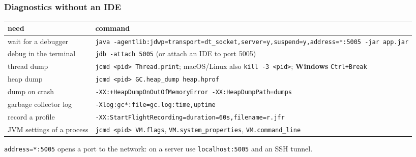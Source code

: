 \documentclass[aspectratio=169,10pt,compress]{beamer}
\newcommand{\win}{\textbf{Windows}}
\begin{document}
\begin{frame}[t,fragile] \frametitle{Diagnostics without an IDE}
  \begin{center}\tiny
  \begin{tabular}{ll}
    \toprule
    need                         & command \\
    \midrule
    wait for a debugger          & \texttt{java -agentlib:jdwp=transport=dt\_socket,server=y,suspend=y,address=*:5005 -jar app.jar} \\
    debug in the terminal        & \texttt{jdb -attach 5005} (or attach an IDE to port 5005) \\
    thread dump                  & \texttt{jcmd <pid> Thread.print}; macOS/Linux also \texttt{kill -3 <pid>}; \win{} \texttt{Ctrl+Break} \\
    heap dump                    & \texttt{jcmd <pid> GC.heap\_dump heap.hprof} \\
    dump on crash                & \texttt{-XX:+HeapDumpOnOutOfMemoryError -XX:HeapDumpPath=dumps} \\
    garbage collector log        & \texttt{-Xlog:gc*:file=gc.log:time,uptime} \\
    record a profile             & \texttt{-XX:StartFlightRecording=duration=60s,filename=r.jfr} \\
    JVM settings of a process    & \texttt{jcmd <pid> VM.flags}, \texttt{VM.system\_properties}, \texttt{VM.command\_line} \\
    \bottomrule
  \end{tabular}
  \end{center}
  \small \texttt{address=*:5005} opens a port to the network: on a server use \texttt{localhost:5005} and an SSH tunnel.
\end{frame}

\end{document}
